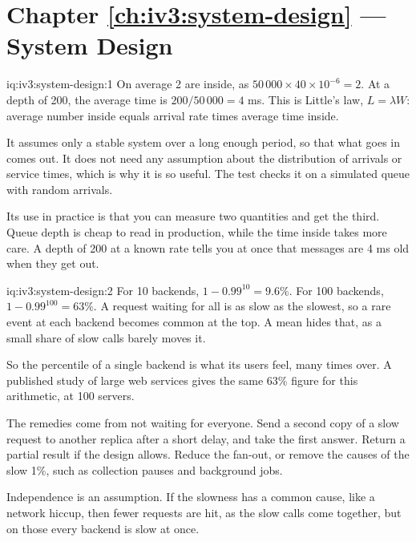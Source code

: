 \section*{Chapter \ref{ch:iv3:system-design} --- System Design}

\begin{solution}{iq:iv3:system-design:1}
On average 2 are inside, as $50\,000 \times 40 \times 10^{-6} = 2$. At a depth of 200, the average time is $200 / 50\,000 = 4$ ms. This is Little's law, $L = \lambda W$: average number inside equals arrival rate times average time inside.

It assumes only a stable system over a long enough period, so that what goes in comes out. It does not need any assumption about the distribution of arrivals or service times, which is why it is so useful. The test checks it on a simulated queue with random arrivals.

Its use in practice is that you can measure two quantities and get the third. Queue depth is cheap to read in production, while the time inside takes more care. A depth of 200 at a known rate tells you at once that messages are 4 ms old when they get out.

\end{solution}

\begin{solution}{iq:iv3:system-design:2}
For 10 backends, $1 - 0.99^{10} = 9.6\%$. For 100 backends, $1 - 0.99^{100} = 63\%$. A request waiting for all is as slow as the slowest, so a rare event at each backend becomes common at the top. A mean hides that, as a small share of slow calls barely moves it.

So the percentile of a single backend is what its users feel, many times over. A published study of large web services gives the same 63\% figure for this arithmetic, at 100 servers.

The remedies come from not waiting for everyone. Send a second copy of a slow request to another replica after a short delay, and take the first answer. Return a partial result if the design allows. Reduce the fan-out, or remove the causes of the slow 1\%, such as collection pauses and background jobs.

Independence is an assumption. If the slowness has a common cause, like a network hiccup, then fewer requests are hit, as the slow calls come together, but on those every backend is slow at once.

\end{solution}

